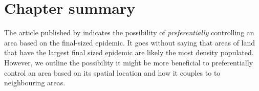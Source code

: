\section{Chapter summary}

The article published by \cite{time-varying-infectivity} indicates the possibility of \textit{preferentially} controlling an area based on the final-sized epidemic. 
It goes without saying that areas of land that have the largest final sized epidemic are likely the most density populated. 
However, we outline the possibility it might be more beneficial to preferentially control an area based on its spatial location and how it couples to to neighbouring areas.










